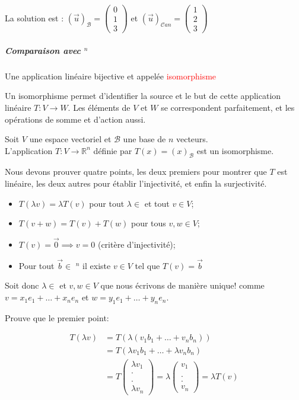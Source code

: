 La solution est :
$(\vec{u})_\mathcal{B} =  \begin{pmatrix}
    0 \\ 1 \\ 3
\end{pmatrix}$ et $(\vec{u})_{\mathcal{C}
an} = \begin{pmatrix}
    1 \\ 2 \\ 3
\end{pmatrix}$
\subparagraph{Comparaison avec \R$^n$}
\begin{definition}
    Une application linéaire bijective et appelée \textcolor{red}{isomorphisme}
\end{definition}
Un isomorphisme permet d'identifier la source et le but de cette application linéaire $T : V \to W$. Les éléments de $V$ et $W$ se correspondent parfaitement, et les opérations de somme et d'action aussi.
\begin{theoreme}
    Soit $V$ une espace vectoriel et $\mathcal{B}$ une base de $n$ vecteurs. \\
    L'application $T : V \to \mathbb{R}^n$ définie par $T(x) = (x)_{\mathcal{B}}$ est un isomorphisme.
\end{theoreme}
\begin{dem}
    Nous devons prouver quatre points, les deux premiers pour montrer que $T$ est linéaire, les deux autres pour établir l'injectivité, et enfin la surjectivité.
    \begin{itemize}
        \item $T(\lambda v) = \lambda T(v)$ pour tout $\lambda \in$ \R et tout $v \in V$;
        \item $T(v + w) = T(v) + T(w)$ pour tous $v, w \in V$;
        \item $T(v) = \vec{0} \implies v = 0$ (critère d'injectivité);
        \item Pour tout $\vec{b} \in$ \R$^n$ il existe $v \in V$ tel que $T(v) = \vec{b}$

    \end{itemize}
    Soit donc $\lambda \in$ \R et $v, w \in V$ que nous écrivons de manière unique! comme $v = x_1e_1 + \dots + x_ne_n$ et $w = y_1e_1 + \dots + y_ne_n$.
\end{dem}
Prouve que le premier point:

\begin{align*}
T(\lambda v) &= T ( \lambda(v_1b_1 + \dots + v_nb_n)) \\
&= T(\lambda v_1 b_1 + \dots + \lambda v_nb_n) \\
&= T\begin{pmatrix}
    \lambda v_1 \\
    .\\\\. \\ \lambda v_n
\end{pmatrix} = \lambda \begin{pmatrix}
    v_1 \\ \\. \\. \\v_n
\end{pmatrix} = \lambda T(v)
\end{align*}


